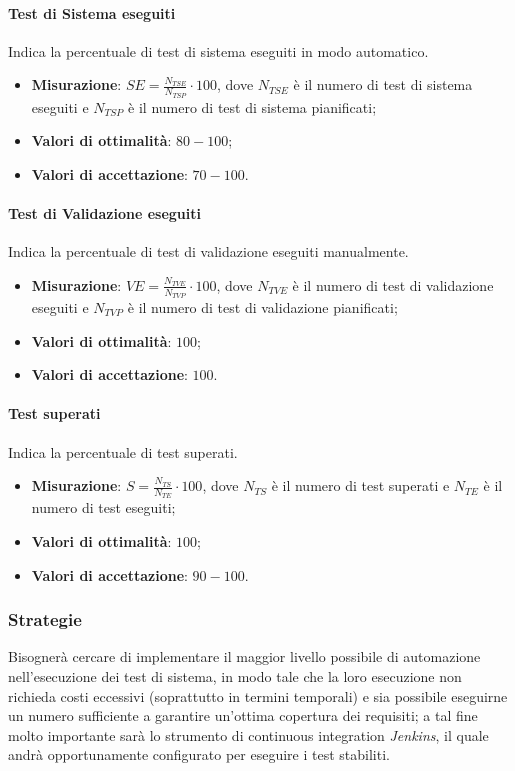\paragraph{Test di Sistema eseguiti}
\label{tsissup}
Indica la percentuale di test di sistema eseguiti in modo automatico.
\begin{itemize}
\item \textbf{Misurazione}: $SE=\frac{N_{TSE}}{N_{TSP}} \cdot 100$, dove $N_{TSE}$ è il numero di test di sistema eseguiti e $N_{TSP}$ è il numero di test di sistema pianificati;
\item \textbf{Valori di ottimalità}: $80 - 100$;
\item \textbf{Valori di accettazione}: $70 - 100$.
\end{itemize}
\paragraph{Test di Validazione eseguiti}
\label{tvalese}
Indica la percentuale di test di validazione eseguiti manualmente.
\begin{itemize}
\item \textbf{Misurazione}: $VE=\frac{N_{TVE}}{N_{TVP}} \cdot 100$, dove $N_{TVE}$ è il numero di test di validazione eseguiti e $N_{TVP}$ è il numero di test di validazione pianificati;
\item \textbf{Valori di ottimalità}: $100$;
\item \textbf{Valori di accettazione}: $100$.
\end{itemize}
\paragraph{Test superati}
\label{tsuperati}
Indica la percentuale di test superati.
\begin{itemize}
\item \textbf{Misurazione}: $S=\frac{N_{TS}}{N_{TE}} \cdot 100$, dove $N_{TS}$ è il numero di test superati e $N_{TE}$ è il numero di test eseguiti;
\item \textbf{Valori di ottimalità}: $100$;
\item \textbf{Valori di accettazione}: $90 - 100$.
\end{itemize}
\subsubsection{Strategie}
Bisognerà cercare di implementare il maggior livello possibile di automazione nell'esecuzione dei test di sistema, in modo tale che la loro esecuzione non richieda costi eccessivi (soprattutto in termini temporali) e sia possibile eseguirne un numero sufficiente a garantire un'ottima copertura dei requisiti; a tal fine molto importante sarà lo strumento di continuous integration \textit{Jenkins}, il quale andrà opportunamente configurato per eseguire i test stabiliti.
